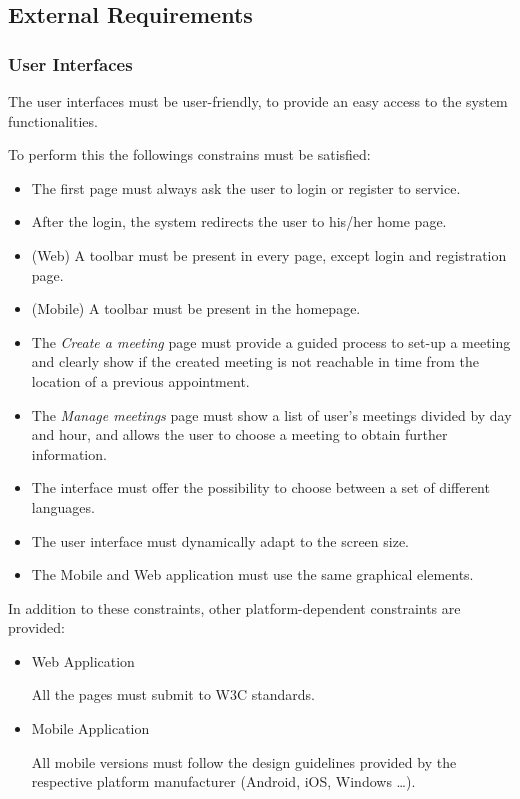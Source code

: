 \subsection{External Requirements}

\subsubsection{User Interfaces}
The user interfaces must be user-friendly, to provide an easy access to the system functionalities.\par
To perform this the followings constrains must be satisfied:
\begin{itemize}
	\item The first page must always ask the user to login or register to service.
	\item After the login, the system redirects the user to his/her home page.
	\item (Web) A toolbar must be present in every page, except login and registration page.
	\item (Mobile) A toolbar must be present in the homepage.
	\item The \emph{Create a meeting} page must provide a guided process to set-up a meeting and clearly show if the created meeting is not reachable in time from the location of a previous appointment.
	\item The \emph{Manage meetings} page must show a list of user's meetings divided by day and hour, and allows the user to choose a meeting to obtain further information.
	\item The interface must offer the possibility to choose between a set of different languages.
	\item The user interface must dynamically adapt to the screen size.
	\item The Mobile and Web application must use the same graphical elements.
\end{itemize}
In addition to these constraints, other platform-dependent constraints are provided:
\begin{itemize}
	\item Web Application\par
		All the pages must submit to W3C standards.
	\item Mobile Application\par
		All mobile versions must follow the design guidelines provided by the respective platform manufacturer (Android, iOS, Windows \dots).
\end{itemize}

